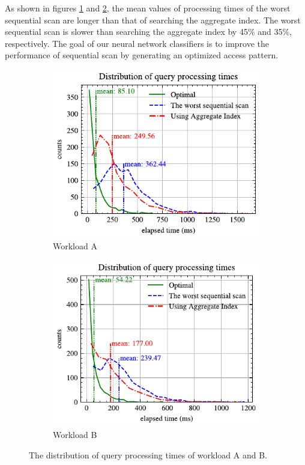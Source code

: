 \documentclass[conference]{IEEEtran}
\begin{document}
As shown in figures \ref{fig:agg_vs_partitioned_A} and \ref{fig:agg_vs_partitioned_B}, the mean values of processing times of the worst sequential scan are longer than that of searching the aggregate index. The worst sequential scan is slower than searching the aggregate index by 45\% and 35\%, respectively. The goal of our neural network classifiers is to improve the performance of sequential scan by generating an optimized access pattern.
\begin{figure}[!th]
	\centering
	\begin{subfigure}{0.45\textwidth}
		\centering
		\includegraphics[]{graphics/agg_vs_partitioned_A.pdf}
		\caption{Workload A}
		\label{fig:agg_vs_partitioned_A}
	\end{subfigure}
	\hfill
	\begin{subfigure}{0.45\textwidth}
		\centering
		\includegraphics[]{graphics/agg_vs_partitioned_B.pdf}
		\caption{Workload B}
		\label{fig:agg_vs_partitioned_B}
	\end{subfigure}
	\caption{The distribution of query processing times of workload A and B.}
	\label{fig:agg_vs_partitioned_all}
\end{figure}
\end{document}
